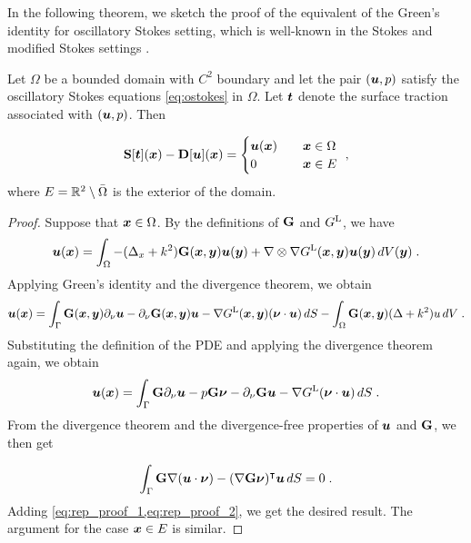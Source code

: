 In the following theorem, we sketch the proof of the equivalent of the
Green's identity for oscillatory Stokes setting, which is well-known
in the Stokes and modified Stokes settings
\cite{Pozrikidis1992,biros2002embedded,ladyzhenskaya1969mathematical}.

\begin{thrm} \label{thrm:rep-theorem}
  Let $\Omega$ be a bounded domain with $C^2$ boundary and let
  the pair $({\boldsymbol u},p)$ satisfy the oscillatory Stokes equations
  \cref{eq:ostokes} in $\Omega$. Let ${\boldsymbol t}$ denote the surface
  traction associated with $({\boldsymbol u},p)$. Then

  \begin{equation} \label{eq:rep-theorem}
    {\bf S} [{\boldsymbol t}]({\boldsymbol x}) - {\bf D}[{\boldsymbol u}]({\boldsymbol x}) = \begin{cases} 
    {\boldsymbol u}({\boldsymbol x}) &\quad {\boldsymbol x} \in \Omega \,  \\
    0 &\quad {\boldsymbol x} \in E 
    \end{cases} \; ,
  \end{equation}
  where $E=\mathbb{R}^2\setminus\bar\Omega$ is the
  exterior of the domain.
\end{thrm}

\begin{proof}
  Suppose that ${\boldsymbol x} \in \Omega$.
  By the definitions of ${\bf G}$ and $G^{\textrm{L}}$, we have
  \begin{equation*}
    {\boldsymbol u}({\boldsymbol x}) = \int_\Omega -(\Delta_x + k^2) {\bf G}({\boldsymbol x},{\boldsymbol y}) {\boldsymbol u}({\boldsymbol y})
    + \nabla \otimes \nabla G^{\textrm{L}}({\boldsymbol x},{\boldsymbol y}) {\boldsymbol u}({\boldsymbol y}) \, dV({\boldsymbol y}) \; .
  \end{equation*}
  Applying Green's identity and the divergence theorem, we
  obtain
  \begin{equation}
    {\boldsymbol u}({\boldsymbol x}) = \int_\Gamma {\bf G}({\boldsymbol x},{\boldsymbol y}) \partial_\nu {\boldsymbol u}
    - \partial_\nu {\bf G}({\boldsymbol x},{\boldsymbol y}) {\boldsymbol u}
    - \nabla G^{\textrm{L}}({\boldsymbol x},{\boldsymbol y}) ({\boldsymbol \nu} \cdot {\boldsymbol u}) \, dS 
    - \int_\Omega {\bf G}({\boldsymbol x},{\boldsymbol y}) (\Delta + k^2) u \, dV \; .
    \nonumber
  \end{equation}
  Substituting the definition of the PDE and applying the divergence
  theorem again, we obtain
  \begin{equation}
    {\boldsymbol u}({\boldsymbol x}) = \int_\Gamma {\bf G} \partial_\nu {\boldsymbol u} - p {\bf G} {\boldsymbol \nu} - \partial_\nu {\bf G} {\boldsymbol u}
    - \nabla G^{\textrm{L}} ({\boldsymbol \nu} \cdot {\boldsymbol u}) \, dS  \; . \label{eq:rep_proof_1}
  \end{equation}
  From the divergence theorem and the divergence-free properties of
  ${\boldsymbol u}$ and ${\bf G}$, we then get

  \begin{equation}
    \int_\Gamma {\bf G} \nabla ({\boldsymbol u} \cdot {\boldsymbol \nu})
    - (\nabla {\bf G} {\boldsymbol \nu})^\intercal {\boldsymbol u} \, dS = 0 \; .  \label{eq:rep_proof_2}
  \end{equation}
  Adding \cref{eq:rep_proof_1,eq:rep_proof_2}, we get the desired
  result. The argument for the case ${\boldsymbol x} \in E$ is similar.
\end{proof}

